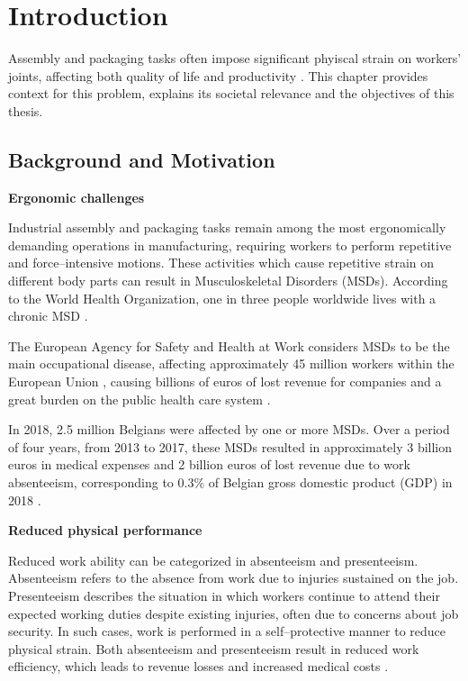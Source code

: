 \documentclass[11pt,a4paper,twoside,openright]{book}
\newcommand{\smalltitle}[1]{%
  \vspace{0.5cm}%
  \noindent\textbf{#1}%
  \vspace{0.2cm}%
  \par\noindent%
}
\begin{document}
\cleardoublepage

\mainmatter

\chapter{Introduction}
\label{ch:introduction}

Assembly and packaging tasks often impose significant phyiscal strain on workers' joints, affecting both quality of life and productivity \cite{greggiWorkRelatedMusculoskeletalDisorders2024}. This chapter provides context for this problem, explains its societal relevance and the objectives of this thesis.

\section{Background and Motivation}

\smalltitle{Ergonomic challenges}
Industrial assembly and packaging tasks remain among the most ergonomically demanding operations in manufacturing, requiring workers to perform repetitive and force--intensive motions. These activities which cause repetitive strain on different body parts can result in Musculoskeletal Disorders (MSDs). According to the World Health Organization, one in three people worldwide lives with a chronic MSD \cite{gorassoHealthEconomicBurden2023}. 

The European Agency for Safety and Health at Work considers MSDs to be the main occupational disease,  affecting approximately 45 million workers within the European Union \cite{gorassoHealthEconomicBurden2023}, causing billions of euros of lost revenue for companies and a great burden on the public health care system \cite{ibvMusculoskeletalDisordersCaused2017}.

In 2018, 2.5 million Belgians were affected by one or more MSDs. Over a period of four years, from 2013 to 2017, these MSDs resulted in approximately 3 billion euros in medical expenses and 2 billion euros of lost revenue due to work absenteeism, corresponding to 0.3\% of Belgian gross domestic product (GDP) in 2018 \cite{gorassoHealthEconomicBurden2023}.

\smalltitle{Reduced physical performance}
Reduced work ability can be categorized in absenteeism and presenteeism. Absenteeism refers to the absence from work due to injuries sustained on the job. Presenteeism describes the situation in which workers continue to attend their expected working duties despite existing injuries, often due to concerns about job security. In such cases, work is performed in a self--protective manner to reduce physical strain. Both absenteeism and presenteeism result in reduced work efficiency, which leads to revenue losses and increased medical costs \cite{oralEvaluationAbsenteeismPresenteeism2024}.
\pagebreak
\end{document}
